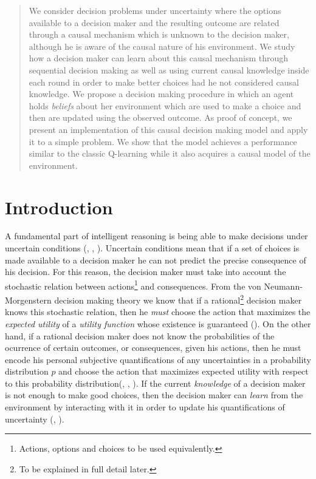 \documentclass[english,letterpaper,12pt,final]{article}
\theoremstyle{definition}
\begin{document}

\singlespacing
\tableofcontents
\newpage
\begin{abstract}
We consider decision problems under uncertainty where the options available to a decision maker and the resulting outcome are related through a causal mechanism which is unknown to the decision maker, although he is aware of the causal nature of his environment. We study how a decision maker can learn about this causal mechanism through sequential decision making as well as using current causal knowledge inside each round in order to make better choices had he not considered causal knowledge. We propose a decision making procedure in which an agent holds \textit{beliefs} about her environment which are used to make a choice and then are updated using the observed outcome. As proof of concept, we present an implementation of this causal decision making model and apply it to a simple problem. We show that the model achieves a performance similar to the classic Q-learning while it also acquires a causal model of the environment. 
\end{abstract}
\section{Introduction}
\indent A fundamental part of intelligent reasoning is being able to make decisions under uncertain conditions (\cite{danks2014unifying}, \cite{lake2017building}, \cite{pearlwhy}). Uncertain conditions mean that if a set of choices is made available to a decision maker he can not predict the precise consequence of his decision. For this reason, the decision maker must take into account the stochastic relation between actions\footnote{Actions, options and choices to be used equivalently.} and consequences. From the von Neumann-Morgenstern decision making theory we know that if a rational\footnote{To be explained in full detail later.} decision maker knows this stochastic relation, then he \textit{must} choose the action that maximizes the \textit{expected utility} of a \textit{utility function} whose existence is guaranteed (\cite{von1944theory}). On the other hand, if a rational decision maker does not know the probabilities of the ocurrence of certain outcomes, or consequences, given his actions, then he must encode his personal subjective quantifications of any uncertainties in a probability distribution $p$ and choose the action that maximizes expected utility with respect to this probability distribution(\cite{savage1954the}, \cite{bernardo2000bayesian}, \cite{gilboa2009decision}). If the current \textit{knowledge} of a decision maker is not enough to make good choices, then the decision maker can \textit{learn} from the environment by interacting with it in order to update his quantifications of uncertainty (\cite{bernardo2000bayesian}, \cite{peterson2017introduction}).
\end{document}
